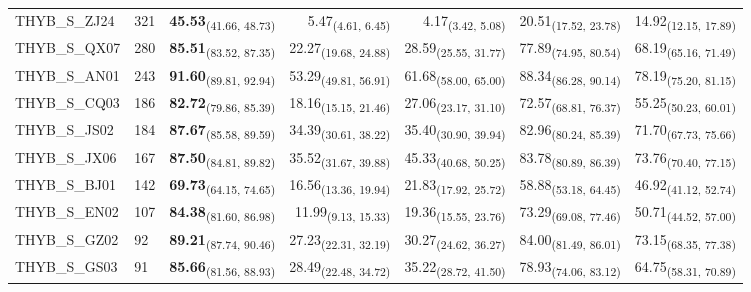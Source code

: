 \begin{table}[p]
\begin{tabular}{llrrrrr}
THYB\_S\_ZJ24 & 321 & \textbf{45.53}\textsubscript{(41.66, 48.73)} & 5.47\textsubscript{(4.61, 6.45)} & 4.17\textsubscript{(3.42, 5.08)} & 20.51\textsubscript{(17.52, 23.78)} & 14.92\textsubscript{(12.15, 17.89)} \\
THYB\_S\_QX07 & 280 & \textbf{85.51}\textsubscript{(83.52, 87.35)} & 22.27\textsubscript{(19.68, 24.88)} & 28.59\textsubscript{(25.55, 31.77)} & 77.89\textsubscript{(74.95, 80.54)} & 68.19\textsubscript{(65.16, 71.49)} \\
THYB\_S\_AN01 & 243 & \textbf{91.60}\textsubscript{(89.81, 92.94)} & 53.29\textsubscript{(49.81, 56.91)} & 61.68\textsubscript{(58.00, 65.00)} & 88.34\textsubscript{(86.28, 90.14)} & 78.19\textsubscript{(75.20, 81.15)} \\
THYB\_S\_CQ03 & 186 & \textbf{82.72}\textsubscript{(79.86, 85.39)} & 18.16\textsubscript{(15.15, 21.46)} & 27.06\textsubscript{(23.17, 31.10)} & 72.57\textsubscript{(68.81, 76.37)} & 55.25\textsubscript{(50.23, 60.01)} \\
THYB\_S\_JS02 & 184 & \textbf{87.67}\textsubscript{(85.58, 89.59)} & 34.39\textsubscript{(30.61, 38.22)} & 35.40\textsubscript{(30.90, 39.94)} & 82.96\textsubscript{(80.24, 85.39)} & 71.70\textsubscript{(67.73, 75.66)} \\
THYB\_S\_JX06 & 167 & \textbf{87.50}\textsubscript{(84.81, 89.82)} & 35.52\textsubscript{(31.67, 39.88)} & 45.33\textsubscript{(40.68, 50.25)} & 83.78\textsubscript{(80.89, 86.39)} & 73.76\textsubscript{(70.40, 77.15)} \\
THYB\_S\_BJ01 & 142 & \textbf{69.73}\textsubscript{(64.15, 74.65)} & 16.56\textsubscript{(13.36, 19.94)} & 21.83\textsubscript{(17.92, 25.72)} & 58.88\textsubscript{(53.18, 64.45)} & 46.92\textsubscript{(41.12, 52.74)} \\
THYB\_S\_EN02 & 107 & \textbf{84.38}\textsubscript{(81.60, 86.98)} & 11.99\textsubscript{(9.13, 15.33)} & 19.36\textsubscript{(15.55, 23.76)} & 73.29\textsubscript{(69.08, 77.46)} & 50.71\textsubscript{(44.52, 57.00)} \\
THYB\_S\_GZ02 & 92 & \textbf{89.21}\textsubscript{(87.74, 90.46)} & 27.23\textsubscript{(22.31, 32.19)} & 30.27\textsubscript{(24.62, 36.27)} & 84.00\textsubscript{(81.49, 86.01)} & 73.15\textsubscript{(68.35, 77.38)} \\
THYB\_S\_GS03 & 91 & \textbf{85.66}\textsubscript{(81.56, 88.93)} & 28.49\textsubscript{(22.48, 34.72)} & 35.22\textsubscript{(28.72, 41.50)} & 78.93\textsubscript{(74.06, 83.12)} & 64.75\textsubscript{(58.31, 70.89)} \\

\end{tabular}
\end{table}
